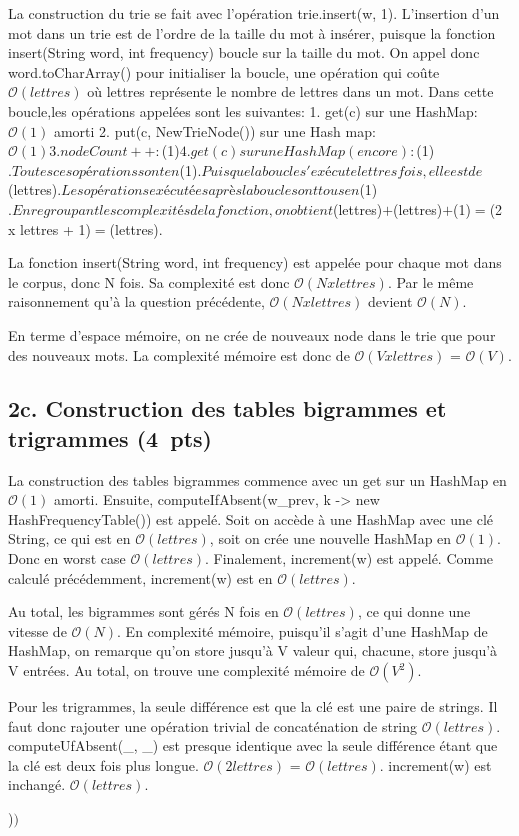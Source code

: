 \documentclass[12pt,a4paper]{article}
\newcommand{\pts}[1]{\hfill\textbf{\small(#1~pts)}}
\newcommand{\bigo}[1]{$\mathcal{O}(#1)$}
\begin{document}
La construction du trie se fait avec l'opération trie.insert(w, 1). L'insertion d'un mot
dans un trie est de l'ordre de la taille du mot à insérer, puisque la fonction insert(String word, int frequency)
boucle sur la taille du mot. On appel donc word.toCharArray() pour initialiser la boucle, une opération qui coûte
\bigo{lettres} où lettres représente le nombre de lettres dans un mot. Dans cette boucle,les opérations appelées sont
les suivantes: 1. get(c) sur une HashMap: \bigo{1} amorti 2. put(c, NewTrieNode()) sur une Hash map: \bigo{1)
3. nodeCount++: \bigo{1} 4.get(c) sur une HashMap (encore): \bigo{1}.

Toutes ces opérations sont en \bigo{1}. Puisque la boucle s'exécute lettres fois, elle est de \bigo{lettres}.
Les opérations exécutées après la boucle sont tous en \bigo{1}. En regroupant les complexités de la fonction, on
obtient \bigo{lettres} + \bigo{lettres} + \bigo{1} = \bigo{2 x lettres + 1} = \bigo{lettres).

La fonction insert(String word, int frequency) est appelée pour chaque mot dans le corpus, donc N fois. Sa complexité
est donc \bigo{N x lettres}. Par le même raisonnement qu'à la question précédente, \bigo{N x lettres} devient \bigo{N}.

En terme d'espace mémoire, on ne crée de nouveaux node dans le trie que pour des nouveaux mots.
La complexité mémoire est donc de \bigo{V x lettres} = \bigo{V}.

\subsection*{2c. Construction des tables bigrammes et trigrammes \pts{4}}

La construction des tables bigrammes commence avec un get sur un HashMap en \bigo{1} amorti.
Ensuite, computeIfAbsent(w_prev, k -> new HashFrequencyTable()) est appelé. Soit on accède à une HashMap avec une
clé String, ce qui est en \bigo{lettres}, soit on crée une nouvelle HashMap en \bigo{1}. Donc en worst case
\bigo{lettres}. Finalement, increment(w) est appelé. Comme calculé précédemment, increment(w) est en \bigo{lettres}.

Au total, les bigrammes sont gérés N fois en \bigo{lettres}, ce qui donne une vitesse de \bigo{N}. En complexité
mémoire, puisqu'il s'agit d'une HashMap de HashMap, on remarque qu'on store jusqu'à V valeur qui, chacune, store
jusqu'à V entrées. Au total, on trouve une complexité mémoire de \bigo{V^2}.

Pour les trigrammes, la seule différence est que la clé est une paire de strings. Il faut donc rajouter une opération
trivial de concaténation de string \bigo{lettres}. computeUfAbsent(_, _) est presque identique avec la seule différence
étant que la clé est deux fois plus longue. \bigo{2 lettres} = \bigo{lettres}. increment(w) est inchangé.
\bigo{lettres}.

}}
\end{document}
